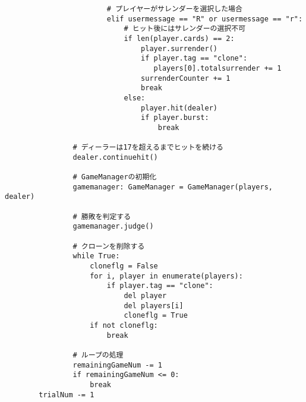 \begin{itemize}
\begin{lstlisting}
                        # プレイヤーがサレンダーを選択した場合
                        elif usermessage == "R" or usermessage == "r":
                            # ヒット後にはサレンダーの選択不可
                            if len(player.cards) == 2:
                                player.surrender()
                                if player.tag == "clone":
                                   players[0].totalsurrender += 1
                                surrenderCounter += 1
                                break
                            else:
                                player.hit(dealer)
                                if player.burst:
                                    break

                # ディーラーは17を超えるまでヒットを続ける
                dealer.continuehit()

                # GameManagerの初期化
                gamemanager: GameManager = GameManager(players, dealer)

                # 勝敗を判定する
                gamemanager.judge()

                # クローンを削除する
                while True:
                    cloneflg = False
                    for i, player in enumerate(players):
                        if player.tag == "clone":
                            del player
                            del players[i]
                            cloneflg = True
                    if not cloneflg:
                        break

                # ループの処理
                remainingGameNum -= 1
                if remainingGameNum <= 0:
                    break
        trialNum -= 1
\end{lstlisting}
\end{itemize}
\newpage